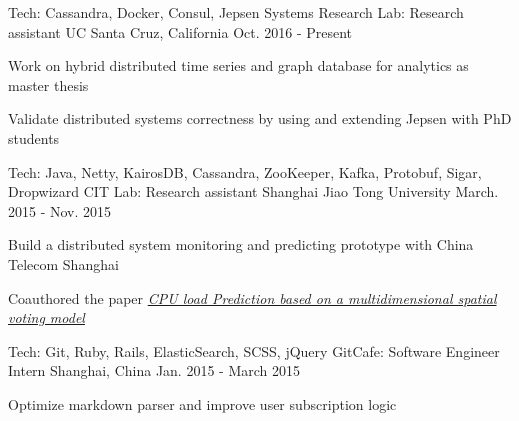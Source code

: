 

\begin{cventries}

  \cventry
    {Tech: Cassandra, Docker, Consul, Jepsen} %
    {Systems Research Lab: Research assistant} %
    {UC Santa Cruz, California} %
    {Oct. 2016 - Present} %
    {
      \begin{cvitems} %
        \item {Work on hybrid distributed time series and graph database for analytics as master thesis}
        \item {Validate distributed systems correctness by using and extending Jepsen with PhD students}
      \end{cvitems}
    }

    \cventry
      {Tech: Java, Netty, KairosDB, Cassandra, ZooKeeper, Kafka, Protobuf, Sigar, Dropwizard} %
      {CIT Lab: Research assistant} %
      {Shanghai Jiao Tong University} %
      {March. 2015 - Nov. 2015} %
      {
        \begin{cvitems} %
          \item {Build a distributed system monitoring and predicting prototype with China Telecom Shanghai}
          \item {Coauthored the paper \textit{\href{https://at15.github.io/pub/cpu_load_prediction.pdf}{CPU load Prediction based on a multidimensional spatial voting model}}}
        \end{cvitems}
      }


  \cventry
    {Tech: Git, Ruby, Rails, ElasticSearch, SCSS, jQuery} %
    {GitCafe: Software Engineer Intern} %
    {Shanghai, China} %
    {Jan. 2015 - March 2015} %
    {
      \begin{cvitems} %
        \item {Optimize markdown parser and improve user subscription logic}
      \end{cvitems}
    }


\end{cventries}
